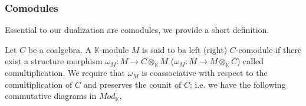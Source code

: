 \documentclass[../thesis.tex]{subfiles}
\begin{document}
            \subsubsection*{Comodules}

                Essential to our dualization are comodules, we provide a short definition.

                \begin{definition}[Comodules]
                    Let $C$ be a coalgebra. A $\mathbb{K}$-module $M$ is said to ba left (right) $C$-comodule if there exist a structure morphism $\omega_M: M \rightarrow C\otimes_{\mathbb{K}}M$ ($\omega_M: M \rightarrow M\otimes_{\mathbb{K}}C$) called comultiplication. We require that $\omega_M$ is coassociative with respect to the comultiplication of $C$ and preserves the counit of $C$; i.e. we have the following commutative diagrams in $Mod_\mathbb{K}$,
                    \begin{center}
                    \end{center}
                    

        

\end{definition}
\end{document}

